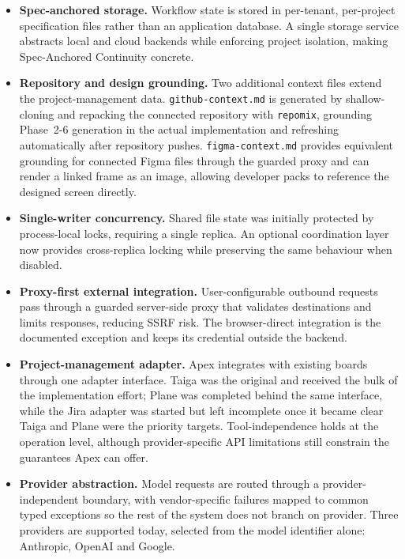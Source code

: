 \begin{itemize}[leftmargin=0.6cm, itemsep=0.4em]

\item \textbf{Spec-anchored storage.} Workflow state is stored in per-tenant, per-project specification files rather than an application database. A single storage service abstracts local and cloud backends while enforcing project isolation, making Spec-Anchored Continuity concrete.

\item \textbf{Repository and design grounding.} Two additional context files extend the project-management data. \texttt{github-context.md} is generated by shallow-cloning and repacking the connected repository with \texttt{repomix}, grounding Phase~2-6 generation in the actual implementation and refreshing automatically after repository pushes. \texttt{figma-context.md} provides equivalent grounding for connected Figma files through the guarded proxy and can render a linked frame as an image, allowing developer packs to reference the designed screen directly.

\item \textbf{Single-writer concurrency.} Shared file state was initially protected by process-local locks, requiring a single replica. An optional coordination layer now provides cross-replica locking while preserving the same behaviour when disabled.

\item \textbf{Proxy-first external integration.} User-configurable outbound requests pass through a guarded server-side proxy that validates destinations and limits responses, reducing \ac{SSRF} risk. The browser-direct integration is the documented exception and keeps its credential outside the backend.

\item \textbf{Project-management adapter.} Apex integrates with existing boards through one adapter interface. Taiga was the original and received the bulk of the implementation effort; Plane was completed behind the same interface, while the Jira adapter was started but left incomplete once it became clear Taiga and Plane were the priority targets. Tool-independence holds at the operation level, although provider-specific \ac{API} limitations still constrain the guarantees Apex can offer.

\item \textbf{Provider abstraction.} Model requests are routed through a provider-independent boundary, with vendor-specific failures mapped to common typed exceptions so the rest of the system does not branch on provider. Three providers are supported today, selected from the model identifier alone: Anthropic, OpenAI and Google.

\end{itemize}

